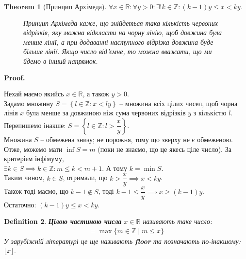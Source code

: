 \documentclass[a4paper, 14pt]{article}
\makeatletter
\def\qed{$\blacksquare$}
\theoremstyle{theoremdd}
\newtheorem{theorem}{Theorem}[subsection]
\theoremstyle{theoremdd}
\newtheorem{definition}[theorem]{Definition}
\theoremstyle{theoremdd}
\theoremstyle{theoremdd}
\theoremstyle{theoremdd}
\theoremstyle{theoremdd}
\theoremstyle{theoremdd}
\theoremstyle{theoremdd}
\renewenvironment{proof}[1][Proof.\\]{\par
\pushQED{\hfill \qed}%
\normalfont \topsep6\p@\@plus6\p@\relax
\trivlist
\item\relax
{\bfseries
#1\@addpunct{.}}\hspace\labelsep\ignorespaces
}{%
\popQED\endtrivlist\@endpefalse
}
\makeatother
\begin{document}
	\begin{theorem}[Принцип Архімеда]
	$\forall x \in \mathbb{R}: \forall y > 0: \exists ! k \in \mathbb{Z}: (k-1)y \leq x < ky$.
	\begin{figure}[H]
	\qquad
	\caption*{Принцип Архімеда каже, що знійдеться така кількість червоних відрізків, яку можна відкласти на чорну лінію, щоб довжина була менше лінії, а при додаванні наступного відрізка довжина буде більше лінії. Якщо число від'ємне, то можна вважати, що ми йдемо в інший напрямок.}
	\end{figure}
	\end{theorem}
	
	\begin{proof}
	Нехай маємо якийсь $x \in \mathbb{R}$, а також $y > 0$.\\
	Задамо множину $S = \left\{l \in \mathbb{Z} :  x < ly \right\}$ -- множина всіх цілих чисел, щоб чорна лінія $x$ була менше за довжиною ніж сума червоних відрізків $y$ з кількістю $l$. Перепишемо інакше: $S = \left\{l \in \mathbb{Z} :  l > \dfrac{x}{y} \right\}$.\\
	Множина $S$ -- обмежена знизу; не порожня, тому що зверху не є обмеженою. Отже, можемо мати $\inf S = m$ (поки не знаємо, що це якесь ціле число). За критерієм інфімуму, \\
	$\exists k \in S \implies k \in \mathbb{Z}: m \leq k < m+1$. А тому $k = \min S$.\\
	Таким чином, $k \in S$, отримали, що $k > \dfrac{x}{y} \implies x < ky$.\\
	Також тоді маємо, що $k-1 \notin S$, тоді $k-1 \leq \dfrac{x}{y} \implies x \geq (k-1)y$.\\
	Остаточно: $(k-1)y \leq x < ky$.
	\end{proof}
	
	\begin{definition}
	\textbf{Цілою частиною числа} $x \in \mathbb{R}$ називають таке число:
	\begin{align*}
	[x] = \max \{ m \in \mathbb{Z} \mid m \leq x\}
	\end{align*}
	У зарубіжній літературі це ще називають \textbf{floor} та позначають по-інакшому: $\lfloor x \rfloor$.
	\end{definition}
	
\end{document}
